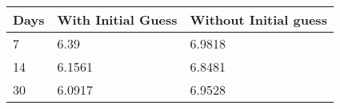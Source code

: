 \begin{tabular}{lll}
Days & With Initial Guess & Without Initial guess \\ 
\hline 
7 & 6.39 & 6.9818 \\ 
14 & 6.1561 & 6.8481 \\ 
30 & 6.0917 & 6.9528 \\ 
\hline 
\end{tabular}
